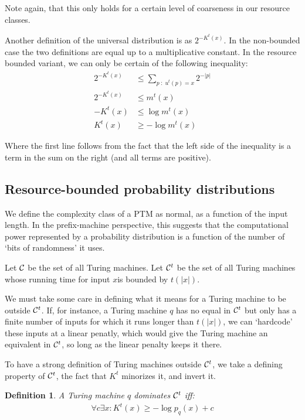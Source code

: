 \documentclass[10pt,a4paper,oneside]{article}
\newtheorem{dfn}{Definition}
\begin{document}
Note again, that this only holds for a certain level of coarseness in our resource classes.

Another definition of the universal distribution is as $2^{-K^t(x)}$. In the non-bounded case the two definitions are equal up to a multiplicative constant. In the resource bounded variant, we can only be certain of the following inequality:
\begin{align*}
2^{-K^t(x)} &\leq \sum_{p\;:\;u^t(p) = x} 2^{-|p|}  \\
2^{-K^t(x)} &\leq m^t(x) \\
-K^t(x) &\leq \log m^t(x) \\ 
K^t(x) &\geq -\log m^t(x)
\end{align*}

Where the first line follows from the fact that the left side of the inequality is a term in the sum on the right (and all terms are positive). 

\subsection*{Resource-bounded probability distributions}

We define the complexity class of a PTM as normal, as a function of the input length. In the prefix-machine perspective, this suggests that the computational power represented by a probability distribution is a function of the number of `bits of randomness' it uses.

Let $\cal C$ be the set of all Turing machines. Let ${\cal C}^t$ be the set of all Turing machines whose running time for input $x$is bounded by $t(|x|)$.

We must take some care in defining what it means for a Turing machine to be outside ${\cal C}^t$. If, for instance, a Turing machine $q$ has no equal in ${\cal C}^t$ but only has a finite number of inputs for which it runs longer than $t(|x|)$, we can `hardcode' these inputs at a linear penatly, which would give the Turing machine an equivalent in ${\cal C}^t$, so long as the linear penalty keeps it there. 

To have a strong definition of Turing machines outside ${\cal C}^t$, we take a defining property of ${\cal C}^t$, the fact that $K^t$ minorizes it, and invert it.
 
\begin{dfn}
A Turing machine $q$ dominates ${\cal C}^t$ iff:
\begin{align*}
\forall c \exists x : K^t(x) \geq -\log p_q(x) + c
\end{align*}
\label{dfn:domination}
\end{dfn}
\end{document}
